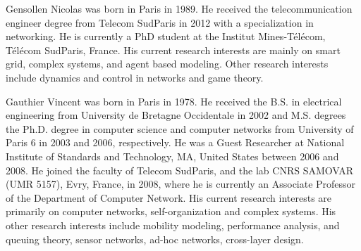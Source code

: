 \documentclass[journal]{IEEEtran}
\begin{document}
\begin{IEEEbiography}%
{Gensollen Nicolas}
was born in Paris in 1989. He received the telecommunication engineer degree from Telecom SudParis in 2012 with a specialization in networking. He is currently a PhD student at the Institut Mines-T\'el\'ecom, T\'el\'ecom SudParis, France. His current research interests are mainly on smart grid, complex systems, and agent based modeling. Other research interests include dynamics and control in networks and game theory. 
\end{IEEEbiography}



\begin{IEEEbiography}%
{Gauthier Vincent}
was born in Paris in 1978. He received the B.S. in electrical engineering from University de Bretagne Occidentale in 2002 and M.S. degrees the Ph.D. degree in computer science and computer networks from University of Paris 6 in 2003 and 2006, respectively. He was a Guest Researcher at National Institute of Standards and Technology, MA, United States between 2006 and 2008. He joined the faculty of Telecom SudParis, and the lab CNRS SAMOVAR (UMR 5157), Evry, France, in 2008, where he is currently an Associate Professor of the Department of Computer Network. His current research interests are primarily on computer networks, self-organization and complex systems. His other research interests include mobility modeling, performance analysis, and queuing theory, sensor networks, ad-hoc networks, cross-layer design.
\end{IEEEbiography}
\end{document}
